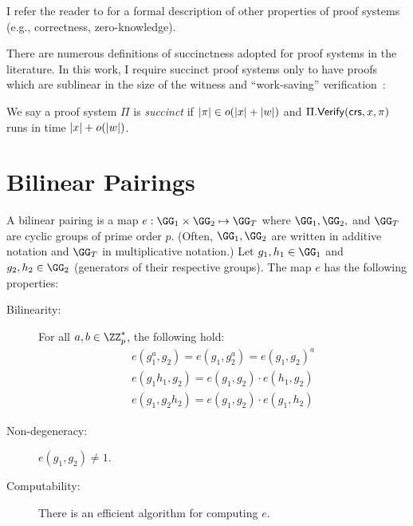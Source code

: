 I refer the reader to \cite{Thaler23,GoldreichFoC} for a formal description of other properties of proof systems (e.g., correctness, zero-knowledge). 

There are numerous definitions of succinctness adopted for proof systems in the literature. In this work, I require succinct proof systems only to have proofs which are sublinear in the size of the witness and ``work-saving'' verification~\cite{snark-misconceptions}:

\begin{definition}[succinctness]
    We say a proof system $\Pi$ is \emph{succinct} if $\lvert \pi \rvert \in o(\lvert x \rvert + \lvert w \rvert)$ and $\Pi.{\mathsf{Verify}}(\mathsf{crs}, x, \pi)$ runs in time $\lvert x \rvert + o(\lvert w \rvert)$.
\end{definition}


\section{Bilinear Pairings}\label{sec:pairings}

\begin{definition}
   A bilinear pairing is a map $e : \GG_1 \times \GG_2 \mapsto \GG_T$ where $\GG_1, \GG_2,$ and $\GG_T$ are cyclic groups of prime order $p$. (Often, $\GG_1,\GG_2$ are written in additive notation and $\GG_T$ in multiplicative notation.) Let $g_1,h_1 \in \GG_1$ and $g_2,h_2 \in \GG_2$ (generators of their respective groups). The map $e$ has the following properties:
   \begin{description}
       \item[Bilinearity:] For all $a,b \in \ZZ_p^*$, the following hold:
       \begin{align*}
           e(g_1^a, g_2) = e(g_1, g_2^a) = e(g_1, g_2)^a\\
           e(g_1 h_1, g_2) = e(g_1, g_2) \cdot e(h_1, g_2)\\
           e(g_1, g_2 h_2) = e(g_1, g_2) \cdot e(g_1, h_2)
        \end{align*}
        \item[Non-degeneracy:] $e(g_1, g_2) \neq 1$.
        \item[Computability:] There is an efficient algorithm for computing $e$.
    \end{description}
\end{definition}


